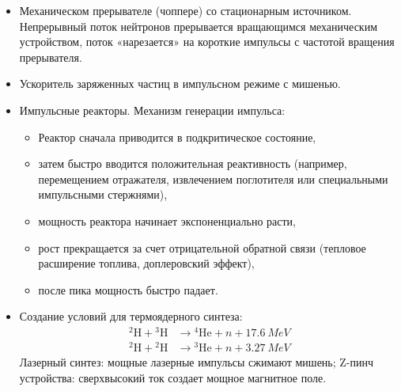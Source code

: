 \documentclass[a4paper]{article}
\begin{document}
\begin{itemize}
    \item Механическом прерывателе (чоппере) со стационарным источником. Непрерывный поток нейтронов прерывается вращающимся механическим устройством, поток «нарезается» на короткие импульсы с частотой вращения прерывателя.
    
    \item Ускоритель заряженных частиц в импульсном режиме с мишенью.
    
    \item Импульсные реакторы. Механизм генерации импульса:
    \begin{itemize}
        \item Реактор сначала приводится в подкритическое состояние,
        \item затем быстро вводится положительная реактивность (например, перемещением отражателя, извлечением поглотителя или специальными импульсными стержнями),
        \item мощность реактора начинает экспоненциально расти,
        \item рост прекращается за счет отрицательной обратной связи (тепловое расширение топлива, доплеровский эффект),
        \item после пика мощность быстро падает.
    \end{itemize}
    
    \item Создание условий для термоядерного синтеза:
    \begin{align*}
        ^2\text{H} + {}^3\text{H} &\to {}^4\text{He} + n + \SI{17.6}{MeV} \\
        ^2\text{H} + {}^2\text{H} &\to {}^3\text{He} + n + \SI{3.27}{MeV}
    \end{align*}
    Лазерный синтез: мощные лазерные импульсы сжимают мишень;
    Z-пинч устройства: сверхвысокий ток создает мощное магнитное поле.
\end{itemize}
\end{document}
